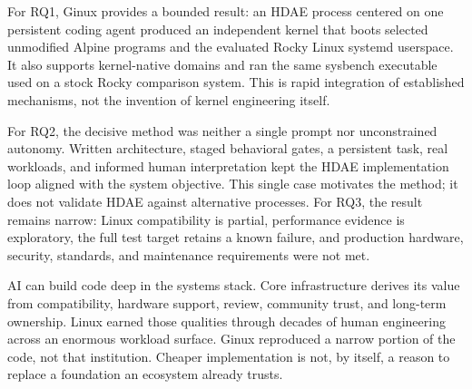 \documentclass[11pt]{article}
\begin{document}
For RQ1, Ginux provides a bounded result: an HDAE process centered on one
persistent coding agent produced an independent kernel that boots selected
unmodified Alpine programs and the evaluated Rocky Linux systemd userspace. It
also supports kernel-native domains and ran
the same sysbench executable used on a stock Rocky comparison system. This is
rapid integration of established mechanisms, not the invention of kernel
engineering itself.

For RQ2, the decisive method was neither a single prompt nor unconstrained
autonomy. Written architecture, staged behavioral gates, a persistent task,
real workloads, and informed human interpretation kept the HDAE implementation loop
aligned with the system objective. This single case motivates the method; it
does not validate HDAE against alternative processes. For RQ3, the result
remains narrow: Linux compatibility is partial, performance evidence is
exploratory, the full test target retains a known failure, and production
hardware, security, standards, and maintenance requirements were not met.

AI can build code deep in the systems stack. Core infrastructure derives its
value from compatibility, hardware support, review, community trust, and
long-term ownership. Linux earned those qualities through decades of human
engineering across an enormous workload surface. Ginux reproduced a narrow
portion of the code, not that institution. Cheaper implementation is not, by
itself, a reason to replace a foundation an ecosystem already trusts.

\clearpage
\begingroup
\small
\setlength{\baselineskip}{8.5pt}
\raggedright


\endgroup
\end{document}
